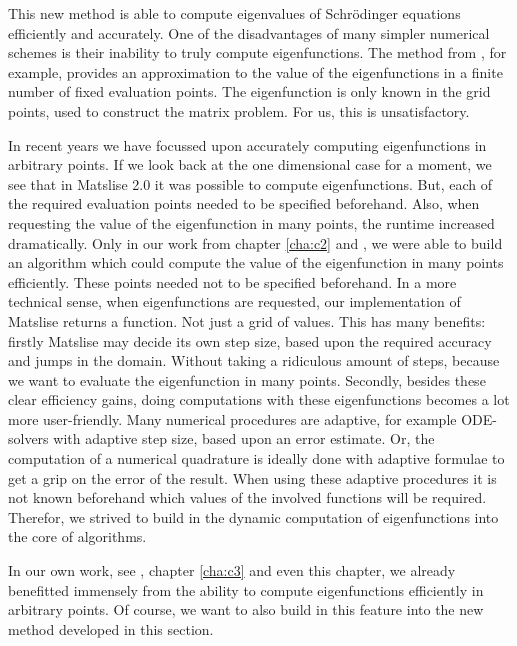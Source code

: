 This new method is able to compute eigenvalues of Schrödinger equations efficiently and accurately. One of the disadvantages of many simpler numerical schemes is their inability to truly compute eigenfunctions. The method from \cite{wang_new_2009}, for example, provides an approximation to the value of the eigenfunctions in a finite number of fixed evaluation points. The eigenfunction is only known in the grid points, used to construct the matrix problem. For us, this is unsatisfactory.

In recent years we have focussed upon accurately computing eigenfunctions in arbitrary points. If we look back at the one dimensional case for a moment, we see that in Matslise 2.0 \cite{ledoux_matslise_2016a} it was possible to compute eigenfunctions. But, each of the required evaluation points needed to be specified beforehand. Also, when requesting the value of the eigenfunction in many points, the runtime increased dramatically. Only in our work from chapter \ref{cha:c2} and \cite{baeyens_fast_2020}, we were able to build an algorithm which could compute the value of the eigenfunction in many points efficiently. These points needed not to be specified beforehand. In a more technical sense, when eigenfunctions are requested, our implementation of Matslise returns a function. Not just a grid of values. This has many benefits: firstly Matslise may decide its own step size, based upon the required accuracy and jumps in the domain. Without taking a ridiculous amount of steps, because we want to evaluate the eigenfunction in many points. Secondly, besides these clear efficiency gains, doing computations with these eigenfunctions becomes a lot more user-friendly. Many numerical procedures are adaptive, for example ODE-solvers with adaptive step size, based upon an error estimate. Or, the computation of a numerical quadrature is ideally done with adaptive formulae to get a grip on the error of the result. When using these adaptive procedures it is not known beforehand which values of the involved functions will be required. Therefor, we strived to build in the dynamic computation of eigenfunctions into the core of algorithms.

In our own work, see \cite{baeyens_improvements_2022}, chapter \ref{cha:c3} and even this chapter, we already benefitted immensely from the ability to compute eigenfunctions efficiently in arbitrary points. Of course, we want to also build in this feature into the new method developed in this section.

